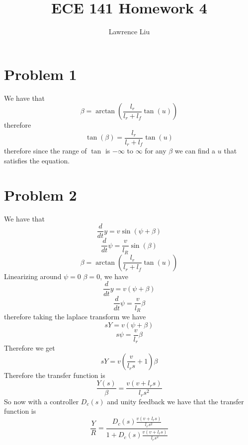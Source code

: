 \documentclass[12pt]{article}
\title{ECE 141 Homework 4}
\author{Lawrence Liu}
\begin{document}
\maketitle
\section*{Problem 1}
We have that $$\beta=\arctan(\frac{l_r}{l_r+l_f}\tan(u))$$
therefore
$$\tan(\beta)=\frac{l_r}{l_r+l_f}\tan(u)$$
therefore since the range of $\tan$ is $-\infty$ to $\infty$ for any $\beta$ we can find a $u$ that satisfies the equation.

\section*{Problem 2}
We have that
$$\frac{d}{dt}y=v\sin(\psi+\beta)$$
$$\frac{d}{dt}\psi=\frac{v}{l_R}\sin(\beta)$$
$$\beta=\arctan(\frac{l_r}{l_r+l_f}\tan(u))$$
Linearizing around $\psi=0$ $\beta=0$, we have
$$\frac{d}{dt}y=v(\psi+\beta)$$
$$\frac{d}{dt}\psi=\frac{v}{l_R}\beta$$
therefore taking the laplace transform we have
$$sY=v(\psi+\beta)$$
$$s\psi=\frac{v}{l_r}\beta$$
Therefore we get
$$sY=v(\frac{v}{l_r s}+1)\beta$$
Therefore the transfer function is
$$\frac{Y(s)}{\beta}=\frac{v(v+l_r s)}{l_r s^2}$$
So now with a controller $D_c(s)$ and unity feedback we have that the transfer function is
$$\frac{Y}{R}=\frac{D_c(s)\frac{v(v+l_r s)}{l_r s^2}}{1+D_c(s)\frac{v(v+l_r s)}{l_r s^2}}$$
\end{document}
